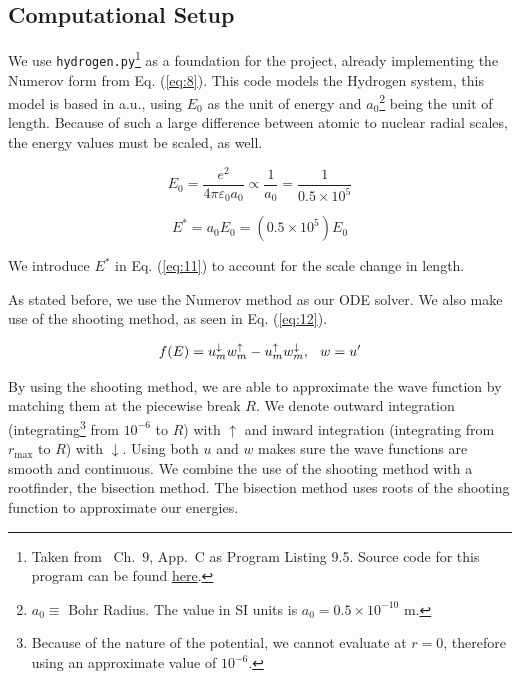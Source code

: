 \documentclass[%
 reprint,
nofootinbib,
 amsmath,amssymb,
 aps,
floatfix,
]{revtex4-2}
\begin{document}
\subsection{\label{subsec:computation}Computational Setup}
{
  We use \texttt{hydrogen.py}\footnote{Taken from \cite{WangCP}~Ch.~9, App.~C as Program Listing 9.5. Source code for this program can be found \href{https://github.com/com-py/compy/blob/master/ch09/Program_9.5_hydrogen.py}{here}.} as a foundation for the project, already implementing the Numerov form from Eq. (\ref{eq:8}). 
  This code models the Hydrogen system, this model is based in a.u., using $E_0$ as the unit of energy and $a_0$\footnote{$a_0 \equiv$ Bohr Radius. The value in SI units is $a_0 = 0.5 \times 10^{-10}$ m.} being the unit of length. 
  Because of such a large difference between atomic to nuclear radial scales, the energy values must be scaled, as well. 

  \begin{equation}
      E_0 = \frac{e^2}{4\pi \varepsilon_0 a_0} \propto \frac{1}{a_0} = \frac{1}{0.5 \times 10^{5}}
      \label{eq:10}
    \end{equation}

  \begin{equation}
      E^* = a_0 E_0 = (0.5 \times 10^{5})E_0
      \label{eq:11}
  \end{equation}

  We introduce $E^*$ in Eq. (\ref{eq:11}) to account for the scale change in length. 
  
  As stated before, we use the Numerov method as our ODE solver. 
  We also make use of the shooting method, as seen in Eq. (\ref{eq:12}). 
  
  \begin{equation}
    f(E) = u_m^\downarrow w_m^\uparrow - u_m^\uparrow w_m^\downarrow, \hspace{0.25cm} w = u'
    \label{eq:12}
  \end{equation}

  By using the shooting method, we are able to approximate the wave function by matching them at the piecewise break $R$. 
  We denote outward integration (integrating\footnote{Because of the nature of the potential, we cannot evaluate at $r = 0$, therefore using an approximate value of $10^{-6}$.} from $10^{-6}$ to $R$) with $\uparrow$ and inward integration (integrating from $r_{\text{max}}$ to $R$) with $\downarrow$. 
  Using both $u$ and $w$ makes sure the wave functions are smooth and continuous. 
  We combine the use of the shooting method with a rootfinder, the bisection method. 
  The bisection method uses roots of the shooting function to approximate our energies. 

}
\end{document}

